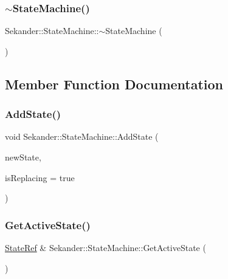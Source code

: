 \subsubsection{\texorpdfstring{$\sim$\+State\+Machine()}{~StateMachine()}}
{\footnotesize\ttfamily Sekander\+::\+State\+Machine\+::$\sim$\+State\+Machine (\begin{DoxyParamCaption}{ }\end{DoxyParamCaption})\hspace{0.3cm}{\ttfamily [inline]}}



\subsection{Member Function Documentation}
\mbox{\label{classSekander_1_1StateMachine_aae2cbc1386cfe4e71d91474536ba25c8}} 
\subsubsection{\texorpdfstring{Add\+State()}{AddState()}}
{\footnotesize\ttfamily void Sekander\+::\+State\+Machine\+::\+Add\+State (\begin{DoxyParamCaption}\item[{\hyperlink{namespaceSekander_a8503cedf9c863e9f6986eb29f2296f1a}{State\+Ref}}]{new\+State,  }\item[{bool}]{is\+Replacing = {\ttfamily true} }\end{DoxyParamCaption})}

\mbox{\label{classSekander_1_1StateMachine_ae1501a43739f33ae0739532b0f2737b1}} 
\subsubsection{\texorpdfstring{Get\+Active\+State()}{GetActiveState()}}
{\footnotesize\ttfamily \hyperlink{namespaceSekander_a8503cedf9c863e9f6986eb29f2296f1a}{State\+Ref} \& Sekander\+::\+State\+Machine\+::\+Get\+Active\+State (\begin{DoxyParamCaption}{ }\end{DoxyParamCaption})}

